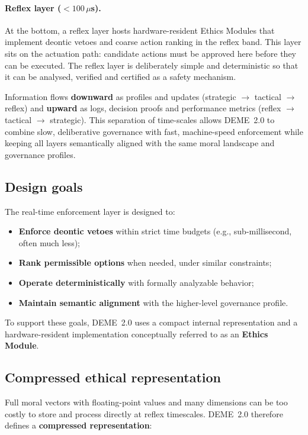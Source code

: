 \documentclass[11pt]{article}
\begin{document}
\paragraph{Reflex layer ($< 100\,\mu$s).}
At the bottom, a reflex layer hosts hardware-resident Ethics Modules that implement deontic vetoes and coarse action ranking in the reflex band. This layer sits on the actuation path: candidate actions must be approved here before they can be executed. The reflex layer is deliberately simple and deterministic so that it can be analysed, verified and certified as a safety mechanism.

Information flows \textbf{downward} as profiles and updates (strategic $\to$ tactical $\to$ reflex) and \textbf{upward} as logs, decision proofs and performance metrics (reflex $\to$ tactical $\to$ strategic). This separation of time-scales allows DEME~2.0 to combine slow, deliberative governance with fast, machine-speed enforcement while keeping all layers semantically aligned with the same moral landscape and governance profiles.

\subsection{Design goals}

The real-time enforcement layer is designed to:

\begin{itemize}
  \item \textbf{Enforce deontic vetoes} within strict time budgets (e.g., sub-millisecond, often much less);
  \item \textbf{Rank permissible options} when needed, under similar constraints;
  \item \textbf{Operate deterministically} with formally analyzable behavior;
  \item \textbf{Maintain semantic alignment} with the higher-level governance profile.
\end{itemize}

To support these goals, DEME~2.0 uses a compact internal representation and a hardware-resident implementation conceptually referred to as an \textbf{Ethics Module}.

\subsection{Compressed ethical representation}

Full moral vectors with floating-point values and many dimensions can be too costly to store and process directly at reflex timescales. DEME~2.0 therefore defines a \textbf{compressed representation}:
\end{document}

